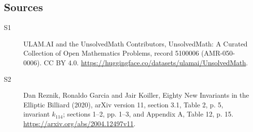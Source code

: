 \documentclass[11pt]{article}
\begin{document}
\subsection{Sources}
\begin{description}
\item[\hypertarget{source:5100006:1}{S1}] ULAM.AI and the UnsolvedMath Contributors, UnsolvedMath: A Curated Collection of Open Mathematics Problems, record 5100006 (AMR-050-0006). CC BY 4.0. \url{https://huggingface.co/datasets/ulamai/UnsolvedMath}.
\item[\hypertarget{source:5100006:2}{S2}] Dan Reznik, Ronaldo Garcia and Jair Koiller, Eighty New Invariants in the Elliptic Billiard (2020), arXiv version 11, section 3.1, Table 2, p. 5, invariant $k_{114}$; sections 1--2, pp. 1--3, and Appendix A, Table 12, p. 15. \url{https://arxiv.org/abs/2004.12497v11}.
\end{description}
\label{end:5100006}
\end{document}
